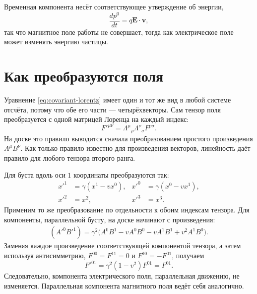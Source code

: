 Временная компонента несёт соответствующее утверждение об энергии,
\begin{equation}
  \frac{dp^0}{dt}=q\boldsymbol E\cdot\boldsymbol v,
\end{equation}
так что магнитное поле работы не совершает, тогда как электрическое поле может изменять энергию частицы.

\begin{classroomqa}
\end{classroomqa}

\section{Как преобразуются поля}

Уравнение \eqref{eq:covariant-lorentz} имеет один и тот же вид в любой системе отсчёта, потому что обе его части — четырёхвекторы. Сам тензор поля преобразуется с одной матрицей Лоренца на каждый индекс:
\begin{equation}
  F'^{\mu\nu}
  =\Lambda^\mu{}_{\rho}\Lambda^\nu{}_{\sigma}F^{\rho\sigma}.
  \label{eq:tensor-transform}
\end{equation}
На доске это правило выводится сначала преобразованием простого произведения \(A^\mu B^\nu\). Как только правило известно для произведения векторов, линейность даёт правило для любого тензора второго ранга.

Для буста вдоль оси \(1\) координаты преобразуются так:
\begin{align}
  x'^1&=\gamma(x^1-vx^0), &
  x'^0&=\gamma(x^0-vx^1), \\
  x'^2&=x^2, & x'^3&=x^3.
\end{align}
Применим то же преобразование по отдельности к обоим индексам тензора. Для компоненты, параллельной бусту, на доске начинают с произведения:
\begin{align}
  (A'^0B'^1)
  =\gamma^2\bigl(
     A^0B^1-vA^0B^0-vA^1B^1+v^2A^1B^0
   \bigr).
\end{align}
Заменяя каждое произведение соответствующей компонентой тензора, а затем используя антисимметрию, \(F^{00}=F^{11}=0\) и \(F^{10}=-F^{01}\), получаем
\begin{equation}
  F'^{01}
  =\gamma^2(1-v^2)F^{01}
  =F^{01}.
\end{equation}
Следовательно, компонента электрического поля, параллельная движению, не изменяется. Параллельная компонента магнитного поля ведёт себя аналогично.

